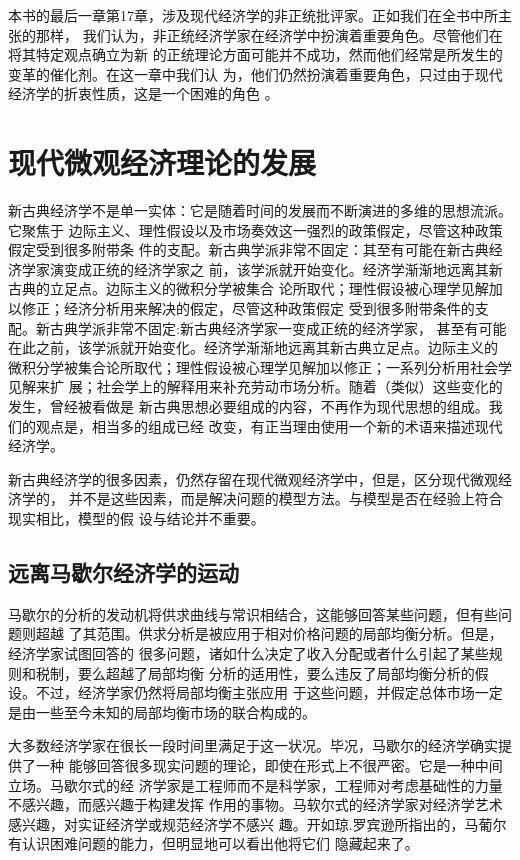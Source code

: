 本书的最后一章第17章，涉及现代经济学的非正统批评家。正如我们在全书中所主张的那样，
我们认为，非正统经济学家在经济学中扮演着重要角色。尽管他们在将其特定观点确立为新
的正统理论方面可能并不成功，然而他们经常是所发生的变革的催化剂。在这一章中我们认
为，他们仍然扮演着重要角色，只过由于现代经济学的折衷性质，这是一个困难的角色 。

\chapter{现代微观经济理论的发展}

新古典经济学不是单一实体：它是随着时间的发展而不断演进的多维的思想流派。它聚焦于
边际主义、理性假设以及市场奏效这一强烈的政策假定，尽管这种政策假定受到很多附带条
件的支配。新古典学派非常不固定：其至有可能在新古典经济学家演变成正统的经济学家之
前，该学派就开始变化。经济学渐渐地远离其新古典的立足点。边际主义的微积分学被集合
论所取代；理性假设被心理学见解加以修正；经济分析用来解决的假定，尽管这种政策假定
受到很多附带条件的支配。新古典学派非常不固定:新古典经济学家一变成正统的经济学家，
甚至有可能在此之前，该学派就开始变化。经济学渐渐地远离其新古典立足点。边际主义的
微积分学被集合论所取代；理性假设被心理学见解加以修正；一系列分析用社会学见解来扩
展；社会学上的解释用来补充劳动市场分析。随着（类似）这些变化的发生，曾经被看做是
新古典思想必要组成的内容，不再作为现代思想的组成。我们的观点是，相当多的组成已经
改变，有正当理由使用一个新的术语来描述现代经济学。

新古典经济学的很多因素，仍然存留在现代微观经济学中，但是，区分现代微观经济学的，
并不是这些因素，而是解决问题的模型方法。与模型是否在经验上符合现实相比，模型的假
设与结论并不重要。

\section{远离马歇尔经济学的运动}

马歇尔的分析的发动机将供求曲线与常识相结合，这能够回答某些问题，但有些问题则超越
了其范围。供求分析是被应用于相对价格问题的局部均衡分析。但是，经济学家试图回答的
很多问题，诸如什么决定了收入分配或者什么引起了某些规则和税制，要么超越了局部均衡
分析的适用性，要么违反了局部均衡分析的假设。不过，经济学家仍然将局部均衡主张应用
于这些问题，并假定总体市场一定是由一些至今未知的局部均衡市场的联合构成的。

大多数经济学家在很长一段时间里满足于这一状况。毕况，马歇尔的经济学确实提供了一种
能够回答很多现实问题的理论，即使在形式上不很严密。它是一种中间立场。马歇尔式的经
济学家是工程师而不是科学家，工程师对考虑基础性的力量不感兴趣，而感兴趣于构建发挥
作用的事物。马软尔式的经济学家对经济学艺术感兴趣，对实证经济学或规范经济学不感兴
趣。开如琼.罗宾逊所指出的，马葡尔有认识困难问题的能力，但明显地可以看出他将它们
隐藏起来了。

